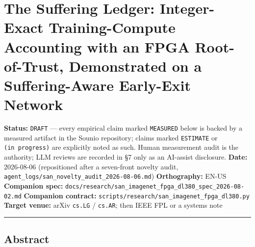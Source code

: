 \documentclass[
]{article}
\author{}
\date{}
\begin{document}
\hypertarget{the-suffering-ledger-integer-exact-training-compute-accounting-with-an-fpga-root-of-trust-demonstrated-on-a-suffering-aware-early-exit-network}{%
\section{The Suffering Ledger: Integer-Exact Training-Compute Accounting
with an FPGA Root-of-Trust, Demonstrated on a Suffering-Aware Early-Exit
Network}\label{the-suffering-ledger-integer-exact-training-compute-accounting-with-an-fpga-root-of-trust-demonstrated-on-a-suffering-aware-early-exit-network}}

\textbf{Status:} \texttt{DRAFT} --- every empirical claim marked
\texttt{MEASURED} below is backed by a measured artifact in the Sounio
repository; claims marked \texttt{ESTIMATE} or \texttt{(in\ progress)}
are explicitly noted as such. Human measurement audit is the authority;
LLM reviews are recorded in §7 only as an AI-assist disclosure.
\textbf{Date:} 2026-08-06 (repositioned after a seven-front novelty
audit, \texttt{agent\_logs/san\_novelty\_audit\_2026-08-06.md})
\textbf{Orthography:} EN-US \textbf{Companion spec:}
\texttt{docs/research/san\_imagenet\_fpga\_dl380\_spec\_2026-08-02.md}
\textbf{Companion contract:}
\texttt{scripts/research/san\_imagenet\_fpga\_dl380.py} \textbf{Target
venue:} arXiv \texttt{cs.LG} / \texttt{cs.AR}; then IEEE FPL or a
systems note

\begin{center}\rule{0.5\linewidth}{0.5pt}\end{center}

\hypertarget{abstract}{%
\subsection{Abstract}\label{abstract}}
\end{document}
